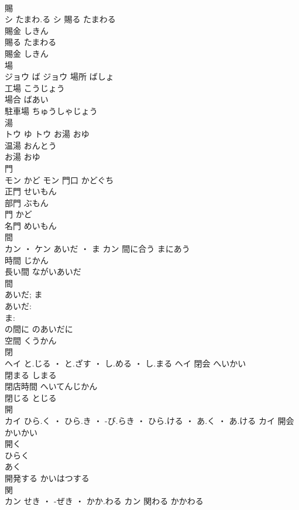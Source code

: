 \documentclass[8pt]{extreport}
\begin{document}
\begin{CJK}{UTF8}{min}
\\	賜	
\\	シ	たまわ.る	シ	賜る	たまわる	
\\	賜金	しきん	
\\	賜る	たまわる	
\\	賜金	しきん	
\\	場	
\\	ジョウ	ば	ジョウ	場所	ばしょ	
\\	工場	こうじょう	
\\	場合	ばあい	
\\	駐車場	ちゅうしゃじょう	
\\	湯	
\\	トウ	ゆ	トウ	お湯	おゆ	
\\	温湯	おんとう	
\\	お湯	おゆ	
\\	門	
\\	モン	かど	モン	門口	かどぐち	
\\	正門	せいもん	
\\	部門	ぶもん	
\\	門	かど	
\\	名門	めいもん	
\\	間	
\\	カン ・ ケン	あいだ ・ ま	カン	間に合う	まにあう	
\\	時間	じかん	
\\	長い間	ながいあいだ	
\\	間 
\\	あいだ; ま
\\	あいだ: 
\\	ま: 
\\	の間に	のあいだに	
\\	空間	くうかん	
\\	閉	
\\	ヘイ	と.じる ・ と.ざす ・ し.める ・ し.まる	ヘイ													閉会	へいかい	
\\	閉まる	しまる	
\\	閉店時間	へいてんじかん	
\\	閉じる	とじる	
\\	開	
\\	カイ	ひら.く ・ ひら.き ・ -び.らき ・ ひら.ける ・ あ.く ・ あ.ける	カイ	開会	かいかい	
\\	開く 
\\	ひらく 
\\	あく	
\\	開発する	かいはつする	
\\	関	
\\	カン	せき ・ -ぜき ・ かか.わる	カン	関わる	かかわる	

\end{CJK}
\end{document}
